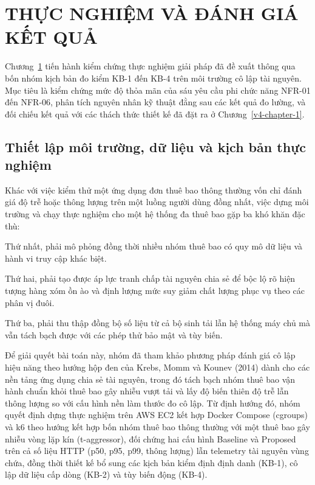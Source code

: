 \chapter{THỰC NGHIỆM VÀ ĐÁNH GIÁ KẾT QUẢ}\label{v4-chapter-5}

Chương~\ref{v4-chapter-5} tiến hành kiểm chứng thực nghiệm giải pháp đã đề xuất thông qua bốn nhóm kịch bản đo kiểm KB-1 đến KB-4 trên môi trường cô lập tài nguyên. Mục tiêu là kiểm chứng mức độ thỏa mãn của sáu yêu cầu phi chức năng NFR-01 đến NFR-06, phân tích nguyên nhân kỹ thuật đằng sau các kết quả đo lường, và đối chiếu kết quả với các thách thức thiết kế đã đặt ra ở Chương~\ref{v4-chapter-1}.

\section{Thiết lập môi trường, dữ liệu và kịch bản thực nghiệm}\label{v4-sec-5-1}

Khác với việc kiểm thử một ứng dụng đơn thuê bao thông thường vốn chỉ đánh giá độ trễ hoặc thông lượng trên một luồng người dùng đồng nhất, việc dựng môi trường và chạy thực nghiệm cho một hệ thống đa thuê bao gặp ba khó khăn đặc thù:

Thứ nhất, phải mô phỏng đồng thời nhiều nhóm thuê bao có quy mô dữ liệu và hành vi truy cập khác biệt.

Thứ hai, phải tạo được áp lực tranh chấp tài nguyên chia sẻ để bộc lộ rõ hiện tượng hàng xóm ồn ào và định lượng mức suy giảm chất lượng phục vụ theo các phân vị đuôi.

Thứ ba, phải thu thập đồng bộ số liệu từ cả bộ sinh tải lẫn hệ thống máy chủ mà vẫn tách bạch được với các phép thử bảo mật và tùy biến.

Để giải quyết bài toán này, nhóm đã tham khảo phương pháp đánh giá cô lập hiệu năng theo hướng hộp đen của Krebs, Momm và Kounev (2014) \cite{v4-24} dành cho các nền tảng ứng dụng chia sẻ tài nguyên, trong đó tách bạch nhóm thuê bao vận hành chuẩn khỏi thuê bao gây nhiễu vượt tải và lấy độ biến thiên độ trễ lẫn thông lượng so với cấu hình nền làm thước đo cô lập. Từ định hướng đó, nhóm quyết định dựng thực nghiệm trên AWS EC2 kết hợp Docker Compose (cgroups) và k6 theo hướng kết hợp bốn nhóm thuê bao thông thường với một thuê bao gây nhiễu vòng lặp kín (t-aggressor), đối chứng hai cấu hình Baseline và Proposed trên cả số liệu HTTP (p50, p95, p99, thông lượng) lẫn telemetry tài nguyên vùng chứa, đồng thời thiết kế bổ sung các kịch bản kiểm định định danh (KB-1), cô lập dữ liệu cấp dòng (KB-2) và tùy biến động (KB-4).


